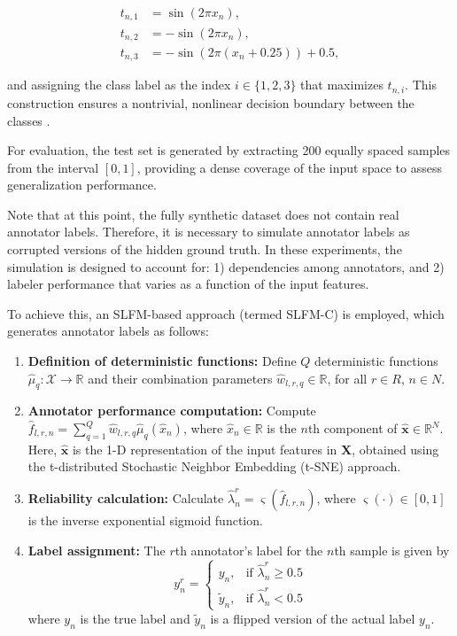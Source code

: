 \begin{equation}\label{eq:classification_targets}
  \begin{aligned}
    t_{n,1} &= \sin(2\pi x_n), \\
    t_{n,2} &= -\sin(2\pi x_n), \\
    t_{n,3} &= -\sin(2\pi (x_n + 0.25)) + 0.5,
  \end{aligned}
\end{equation}

and assigning the class label as the index $i \in \{1, 2, 3\}$ that
maximizes $t_{n,i}$. This construction ensures a nontrivial,
nonlinear decision boundary between the classes \cite{GilEtAlvarez2023CCGPMA}.

For evaluation, the test set is generated by extracting 200 equally
spaced samples from the interval $[0, 1]$, providing a dense coverage
of the input space to assess generalization performance.

Note that at this point, the fully synthetic dataset does not
contain real annotator labels. Therefore, it is necessary to simulate
annotator labels as corrupted versions of the hidden ground truth.
In these experiments, the simulation is
designed to account for: 1) dependencies among annotators, and 2)
labeler performance that varies as a function of the input features.

To achieve this, an \gls{SLFM}-based approach (termed SLFM-C) is employed,
which generates annotator labels as follows:

\begin{enumerate}
\item \textbf{Definition of deterministic functions:} Define $Q$
deterministic functions $\hat{\mu}_q : \mathcal{X} \rightarrow
\mathbb{R}$ and their combination parameters $\hat{w}_{l,r,q} \in
\mathbb{R}$, for all $r \in R$, $n \in N$.
\item \textbf{Annotator performance computation:} Compute
$\hat{f}_{l,r,n} = \sum_{q=1}^{Q} \hat{w}_{l,r,q}
\hat{\mu}_q(\hat{x}_n)$, where $\hat{x}_n \in \mathbb{R}$ is the
$n$th component of $\hat{\mathbf{x}} \in \mathbb{R}^N$. Here,
$\hat{\mathbf{x}}$ is the 1-D representation of the input features in
$\mathbf{X}$, obtained using the t-distributed Stochastic Neighbor
Embedding (t-SNE) approach.
\item \textbf{Reliability calculation:} Calculate $\hat{\lambda}^r_n
= \varsigma(\hat{f}_{l,r,n})$, where $\varsigma(\cdot) \in [0,1]$ is
the inverse exponential sigmoid function.
\item \textbf{Label assignment:} The $r$th annotator's label for the
$n$th sample is given by
\[
  y^r_n =
  \begin{cases}
    y_n, & \text{if } \hat{\lambda}^r_n \geq 0.5 \\
    \tilde{y}_n, & \text{if } \hat{\lambda}^r_n < 0.5
  \end{cases}
\]
where $y_n$ is the true label and $\tilde{y}_n$ is a flipped version
of the actual label $y_n$.
\end{enumerate}

